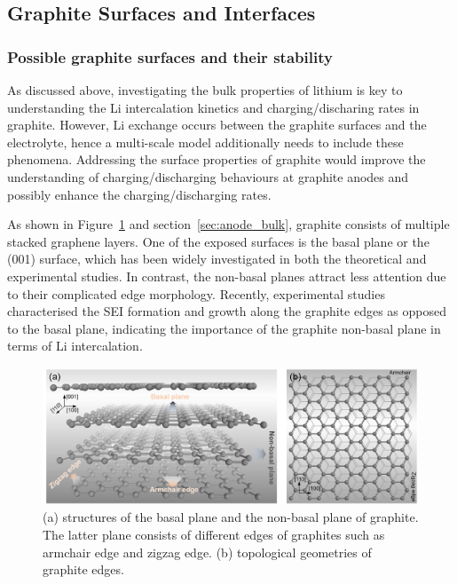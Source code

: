 \documentclass[../main.tex]{subfiles}
\begin{document}
\subsection{Graphite Surfaces and Interfaces}
\label{sec:anodes_surfaces_interfaces}

\subsubsection{Possible graphite surfaces and their stability}

As discussed above, investigating the bulk properties of lithium is key to understanding the Li intercalation kinetics and charging/discharing rates in graphite. However, Li exchange occurs between the graphite surfaces and the electrolyte, hence a multi-scale model additionally needs to include these phenomena. Addressing the surface properties of graphite would improve the understanding of charging/discharging behaviours at graphite anodes and possibly enhance the charging/discharging rates.

As shown in Figure~\ref{fig:graphite_surfs} and section~\ref{sec:anode_bulk}, graphite consists of multiple stacked graphene layers. One of the exposed surfaces is the basal plane or the (001) surface, which has been widely investigated in both the theoretical and experimental studies.\cite{thinius2014theoretical,persson2010,toyoura2010effects,yao2012diffusion,nuli2006intercalation} In contrast, the non-basal planes attract less attention due to their complicated edge morphology. Recently, experimental studies characterised the SEI formation and growth along the graphite edges as opposed to the basal plane, \cite{liu2019situ,zhang2020operando} indicating the importance of the graphite non-basal plane in terms of Li intercalation.

\begin{figure}
    \centering
    \includegraphics[scale=0.4]{figures/Graphite_surfs.png}
    \caption{(a) structures of the basal plane and the non-basal plane of graphite. The latter plane consists of different edges of graphites such as armchair edge and zigzag edge. (b) topological geometries of graphite edges.}
    \label{fig:graphite_surfs}
\end{figure}
\end{document}
